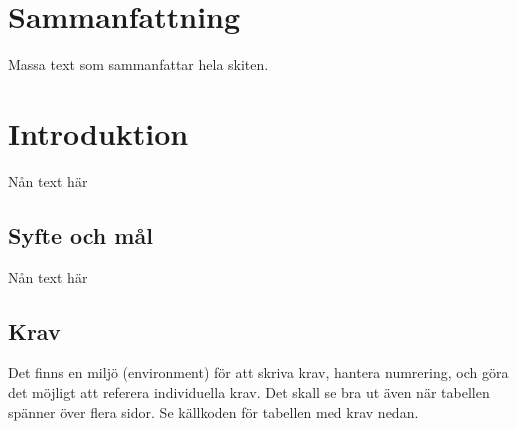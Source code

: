 \documentclass[10pt,oneside,swedish]{lips-no_customer}
\begin{document}
\cleardoublepage
{}\cfoot{\thepage}
\section*{Sammanfattning}
Massa text som sammanfattar hela skiten.
\cleardoublepage
\tableofcontents
\cleardoublepage

\section{Introduktion}
Nån text här
\subsection{Syfte och mål}
Nån text här
\subsection{Krav}
\lipsum[7]

Det finns en miljö (environment) för att skriva krav, hantera
numrering, och göra det möjligt att referera individuella krav. Det
skall se bra ut även när tabellen spänner över flera sidor. Se
källkoden för tabellen med krav nedan.
\end{document}

